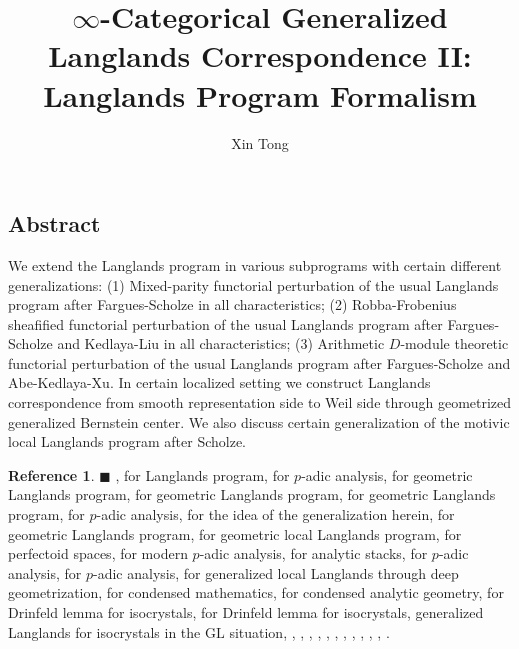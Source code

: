 \documentclass[12pt]{book}
\theoremstyle{definition}
\newtheorem{reference}{Reference}
\begin{document}
\title{$\infty$-Categorical Generalized Langlands Correspondence II: Langlands Program Formalism}
\author{Xin Tong}
\date{}

\maketitle



\newpage
\subsection*{Abstract}
\noindent We extend the Langlands program in various subprograms with certain different generalizations: (1) Mixed-parity functorial perturbation of the usual Langlands program after Fargues-Scholze in all characteristics; (2) Robba-Frobenius sheafified functorial perturbation of the usual Langlands program after Fargues-Scholze and Kedlaya-Liu in all characteristics; (3) Arithmetic $D$-module theoretic functorial perturbation of the usual Langlands program after Fargues-Scholze and Abe-Kedlaya-Xu. In certain localized setting we construct Langlands correspondence from smooth representation side to Weil side through geometrized generalized Bernstein center. We also discuss certain generalization of the motivic local Langlands program after Scholze.


\newpage
\tableofcontents


\newpage
\begin{reference} $\blacksquare$ \cite{DHKM}, \cite{La} for Langlands program, \cite{Ta} for $p$-adic analysis, \cite{DI} for geometric Langlands program, \cite{DII} for geometric Langlands program, \cite{LLa} for geometric Langlands program, \cite{Fon} for $p$-adic analysis, \cite{BS} for the idea of the generalization herein, \cite{VLa} for geometric Langlands program, \cite{GL} for geometric local Langlands program, \cite{SchI} for perfectoid spaces, \cite{SchII} for modern $p$-adic analysis, \cite{SchIII} for analytic stacks, \cite{KLI} for $p$-adic analysis, \cite{KLII} for $p$-adic analysis, \cite{FS} for generalized local Langlands through deep geometrization, \cite{CSI} for condensed mathematics, \cite{CSII} for condensed analytic geometry, \cite{KI} for Drinfeld lemma for isocrystals, \cite{KXII} for Drinfeld lemma for isocrystals, \cite{AI} generalized Langlands for isocrystals in the $\mathrm{GL}$ situation, \cite{DK}, \cite{XZ}, \cite{Z}, \cite{Scho1}, \cite{Scho2}, \cite{V1}, \cite{A1}, \cite{A2}, \cite{A3}, \cite{A4}, \cite{G}, \cite{RS}.
\end{reference}
\end{document}
